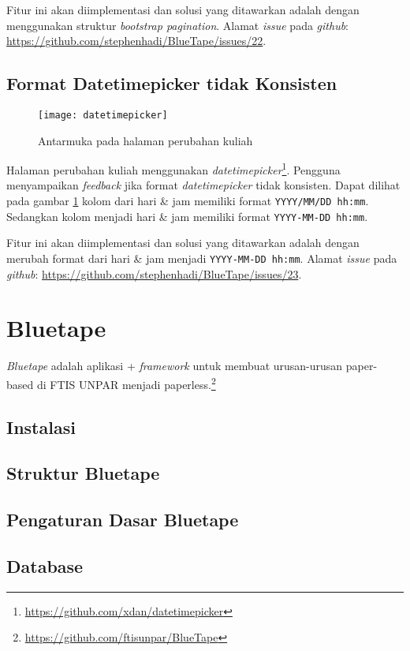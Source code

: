 Fitur ini akan diimplementasi dan solusi yang ditawarkan adalah dengan menggunakan struktur \textit{bootstrap pagination}. Alamat \textit{issue} pada \textit{github}: \url{https://github.com/stephenhadi/BlueTape/issues/22}. 

\subsection{Format Datetimepicker tidak Konsisten}
\label{issue:23}
\begin{figure}[H]
	\centering
	\texttt{[image: datetimepicker]} 
	\caption{Antarmuka pada halaman perubahan kuliah}
	\label{fig:formatdatetimepicker}
\end{figure}

Halaman perubahan kuliah menggunakan \textit{datetimepicker}\footnote{\url{https://github.com/xdan/datetimepicker}}. Pengguna menyampaikan \textit{feedback} jika format \textit{datetimepicker} tidak konsisten. Dapat dilihat pada gambar \ref{fig:formatdatetimepicker} kolom dari hari \& jam memiliki format \texttt{YYYY/MM/DD hh:mm}. Sedangkan kolom menjadi hari \& jam memiliki format \texttt{YYYY-MM-DD hh:mm}.

Fitur ini akan diimplementasi dan solusi yang ditawarkan adalah dengan merubah format dari hari \& jam menjadi \texttt{YYYY-MM-DD hh:mm}. Alamat \textit{issue} pada \textit{github}: \url{https://github.com/stephenhadi/BlueTape/issues/23}.

\section{Bluetape}

\textit{Bluetape} adalah aplikasi + \textit{framework} untuk membuat urusan-urusan paper-based di FTIS UNPAR menjadi paperless.\footnote{\url{https://github.com/ftisunpar/BlueTape}}

\subsection{Instalasi}

\subsection{Struktur Bluetape}

\subsection{Pengaturan Dasar Bluetape}

\subsection{Database}
